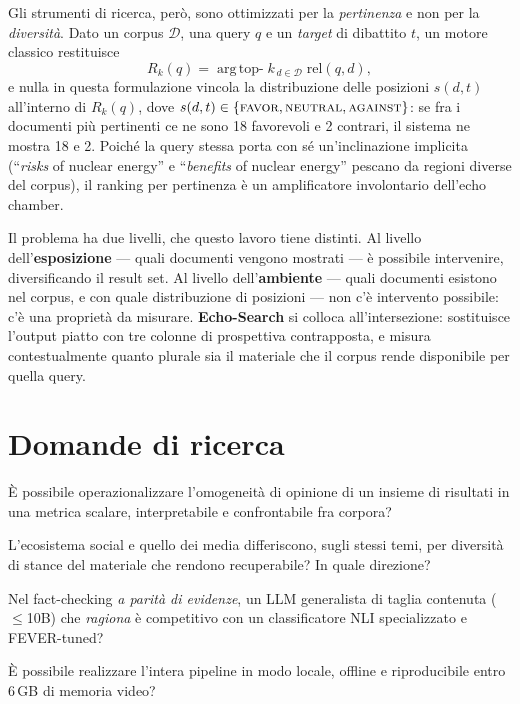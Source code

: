 \documentclass[11pt,a4paper]{report}
\newcommand{\ES}{\textbf{Echo-Search}}
\begin{document}
Gli strumenti di ricerca, però, sono ottimizzati per la \emph{pertinenza} e non per la
\emph{diversità}. Dato un corpus $\mathcal{D}$, una query $q$ e un \emph{target} di dibattito
$t$, un motore classico restituisce
\begin{equation}
R_k(q) = \operatorname*{arg\,top-}k_{\,d \in \mathcal{D}} \; \text{rel}(q, d),
\end{equation}
e nulla in questa formulazione vincola la distribuzione delle posizioni
$s(d,t)$ all'interno di $R_k(q)$, dove
$s(d,t) \in \{\textsc{favor}, \textsc{neutral}, \textsc{against}\}$: se fra i documenti più
pertinenti ce ne sono 18 favorevoli e 2 contrari, il sistema ne mostra 18 e 2. Poiché la query stessa porta con sé un'inclinazione implicita
(``\emph{risks} of nuclear energy'' e ``\emph{benefits} of nuclear energy'' pescano da regioni
diverse del corpus), il ranking per pertinenza è un amplificatore involontario dell'echo
chamber.

Il problema ha due livelli, che questo lavoro tiene distinti. Al livello
dell'\textbf{esposizione} --- quali documenti vengono mostrati --- è possibile intervenire,
diversificando il result set. Al livello dell'\textbf{ambiente} --- quali documenti esistono
nel corpus, e con quale distribuzione di posizioni --- non c'è intervento possibile: c'è una
proprietà da misurare. \ES{} si colloca all'intersezione: sostituisce l'output piatto con tre
colonne di prospettiva contrapposta, e misura contestualmente quanto plurale sia il materiale
che il corpus rende disponibile per quella query.

\section{Domande di ricerca}\label{sec:rq}
\begin{description}[leftmargin=1.5cm,style=nextline]
  \item[RQ1 --- Misurabilità] È possibile operazionalizzare l'omogeneità di opinione di un
        insieme di risultati in una metrica scalare, interpretabile e confrontabile fra corpora?
  \item[RQ2 --- Confronto fra ecosistemi] L'ecosistema social e quello dei media differiscono,
        sugli stessi temi, per diversità di stance del materiale che rendono recuperabile? In
        quale direzione?
  \item[RQ3 --- Motore di verdetto] Nel fact-checking \emph{a parità di evidenze}, un LLM
        generalista di taglia contenuta ($\le$10B) che \emph{ragiona} è competitivo con un
        classificatore NLI specializzato e FEVER-tuned?
  \item[RQ4 --- Fattibilità] È possibile realizzare l'intera pipeline in modo locale, offline
        e riproducibile entro 6\,GB di memoria video?
\end{description}
\end{document}
